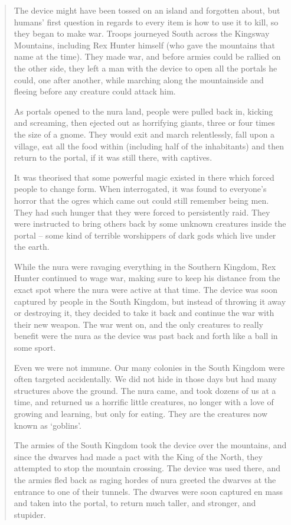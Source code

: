 \begin{multicols}{2}
\begin{quotation}
	The device might have been tossed on an island and forgotten about, but humans' first question in regards to every item is how to use it to kill, so they began to make war.
	Troops journeyed South across the Kingsway Mountains, including Rex Hunter himself (who gave the mountains that name at the time).
	They made war, and before armies could be rallied on the other side, they left a man with the device to open all the portals he could, one after another, while marching along the mountainside and fleeing before any creature could attack him.

	As portals opened to the nura land, people were pulled back in, kicking and screaming, then ejected out as horrifying giants, three or four times the size of a gnome.
	They would exit and march relentlessly, fall upon a village, eat all the food within (including half of the inhabitants) and then return to the portal, if it was still there, with captives.

	It was theorised that some powerful magic existed in there which forced people to change form.
	When interrogated, it was found to everyone's horror that the ogres which came out could still remember being men.
	They had such hunger that they were forced to persistently raid.
	They were instructed to bring others back by some unknown creatures inside the portal -- some kind of terrible worshippers of dark gods which live under the earth.

	While the nura were ravaging everything in the Southern Kingdom, Rex Hunter continued to wage war, making sure to keep his distance from the exact spot where the nura were active at that time.
	The device was soon captured by people in the South Kingdom, but instead of throwing it away or destroying it, they decided to take it back and continue the war with their new weapon.
	The war went on, and the only creatures to really benefit were the nura as the device was past back and forth like a ball in some sport.

	Even we were not immune.
	Our many colonies in the South Kingdom were often targeted accidentally.
	We did not hide in those days but had many structures above the ground.
	The nura came, and took dozens of us at a time, and returned us a horrific little creatures, no longer with a love of growing and learning, but only for eating.
	They are the creatures now known as `goblins'.

	The armies of the South Kingdom took the device over the mountains, and since the dwarves had made a pact with the King of the North, they attempted to stop the mountain crossing.
	The device was used there, and the armies fled back as raging hordes of nura greeted the dwarves at the entrance to one of their tunnels.
	The dwarves were soon captured en mass and taken into the portal, to return much taller, and stronger, and stupider.


\end{quotation}
\end{multicols}
